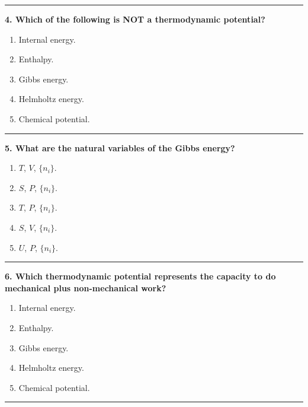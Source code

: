\documentclass[
  9pt,
]{extbook}
\providecommand{\tightlist}{%
  \setlength{\itemsep}{0pt}\setlength{\parskip}{0pt}}
\theoremstyle{definition}
\theoremstyle{definition}
\theoremstyle{definition}
\theoremstyle{definition}
\theoremstyle{remark}
\begin{document}
\begin{center}\rule{0.5\linewidth}{0.5pt}\end{center}

\textbf{4. Which of the following is NOT a thermodynamic potential?}

\begin{enumerate}
\def\labelenumi{\alph{enumi}.}
\tightlist
\item
  Internal energy.
\item
  Enthalpy.
\item
  Gibbs energy.
\item
  Helmholtz energy.
\item
  Chemical potential.
\end{enumerate}

\begin{center}\rule{0.5\linewidth}{0.5pt}\end{center}

\textbf{5. What are the natural variables of the Gibbs energy?}

\begin{enumerate}
\def\labelenumi{\alph{enumi}.}
\tightlist
\item
  \(T\), \(V\), \(\{n_i\}\).
\item
  \(S\), \(P\), \(\{n_i\}\).
\item
  \(T\), \(P\), \(\{n_i\}\).
\item
  \(S\), \(V\), \(\{n_i\}\).
\item
  \(U\), \(P\), \(\{n_i\}\).
\end{enumerate}

\begin{center}\rule{0.5\linewidth}{0.5pt}\end{center}

\textbf{6. Which thermodynamic potential represents the capacity to do mechanical plus non-mechanical work?}

\begin{enumerate}
\def\labelenumi{\alph{enumi}.}
\tightlist
\item
  Internal energy.
\item
  Enthalpy.
\item
  Gibbs energy.
\item
  Helmholtz energy.
\item
  Chemical potential.
\end{enumerate}

\begin{center}\rule{0.5\linewidth}{0.5pt}\end{center}
\end{document}
